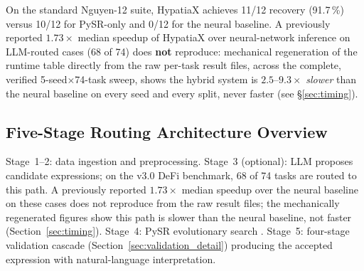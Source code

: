 
On the standard Nguyen-12 suite, HypatiaX achieves 11/12 recovery (91.7\,\%)
versus 10/12 for PySR-only and 0/12 for the neural baseline.
A previously reported $1.73\times$ median speedup of HypatiaX over
neural-network inference on LLM-routed cases (68 of 74) does
\textbf{not} reproduce: mechanical regeneration of the runtime table
directly from the raw per-task result files, across the complete,
verified 5-seed$\times$74-task sweep, shows the hybrid system is
$2.5$--$9.3\times$ \emph{slower} than the neural baseline on every seed
and every split, never faster (see \S\ref{sec:timing}).

\subsection{Five-Stage Routing Architecture Overview}\label{subsec:fivestage-routing-architecture-overview}
\label{sec:validation_framework}

Stage~1--2: data ingestion and preprocessing.
Stage~3 (optional): LLM proposes candidate expressions; on the v3.0 DeFi
benchmark, 68 of 74 tasks are routed to this path. A previously reported
$1.73\times$ median speedup over the neural baseline on these cases does
not reproduce from the raw result files; the mechanically regenerated
figures show this path is slower than the neural baseline, not faster
(Section~\ref{sec:timing}).
Stage~4: PySR evolutionary search \citep{cranmer2023pysr}.
Stage~5: four-stage validation cascade (Section~\ref{sec:validation_detail})
producing the accepted expression with natural-language interpretation.
